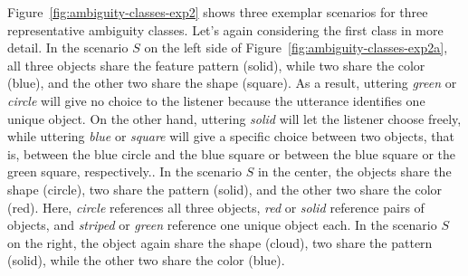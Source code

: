 \documentclass[10pt,a4paper]{article}
\begin{document}
Figure~\ref{fig:ambiguity-classes-exp2} shows three exemplar scenarios for three representative  ambiguity classes. 
Let's again considering the first class in more detail.
In the scenario $S$ on the left side of Figure~\ref{fig:ambiguity-classes-exp2a}, 
all three objects share the feature pattern (solid), while two share the color (blue), and the other two share the shape (square).
As a result, uttering \textit{green} or \textit{circle} will give no choice to the listener because the utterance identifies one unique object. 
On the other hand, uttering \textit{solid} will let the listener choose freely, while uttering \textit{blue} or \textit{square} will give a specific choice between two objects, that is, between the blue circle and the blue square or between the blue square or the green square, respectively..
In the scenario $S$ in the center, the objects share the shape (circle), two share the pattern (solid), and the other two share the color (red).
Here, \textit{circle} references all three objects, \textit{red} or \textit{solid} reference pairs of objects, and \textit{striped} or \textit{green} reference one unique object each.
In the scenario $S$ on the right, the object again share the shape (cloud), two share the pattern (solid), while the other two share the color (blue).
\end{document}
